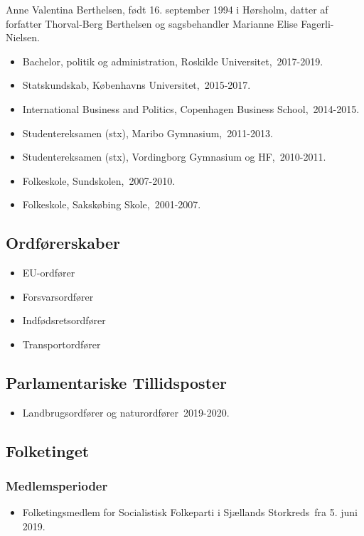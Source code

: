 \documentclass[11pt, a4paper]{awesome-cv}
\begin{document}
\makecvheader[R]
\makelettertitle
\begin{cvletter}
Anne Valentina Berthelsen, født 16. september 1994 i Hørsholm, datter af forfatter Thorval-Berg Berthelsen og sagsbehandler Marianne Elise Fagerli-Nielsen.

\begin{itemize}
\item Bachelor, politik og administration, Roskilde Universitet, 2017-2019.
\item Statskundskab, Københavns Universitet, 2015-2017.
\item International Business and Politics, Copenhagen Business School, 2014-2015.
\item Studentereksamen (stx), Maribo Gymnasium, 2011-2013.
\item Studentereksamen (stx), Vordingborg Gymnasium og HF, 2010-2011.
\item Folkeskole, Sundskolen, 2007-2010.
\item Folkeskole, Sakskøbing Skole, 2001-2007.
\end{itemize}
\subsection*{Ordførerskaber}
\begin{itemize}
\item EU-ordfører
\item Forsvarsordfører
\item Indfødsretsordfører
\item Transportordfører
\end{itemize}
\subsection*{Parlamentariske Tillidsposter}
\begin{itemize}
\item Landbrugsordfører og naturordfører 2019-2020.
\end{itemize}
\subsection*{Folketinget}
\subsubsection*{Medlemsperioder}
\begin{itemize}
\item Folketingsmedlem for Socialistisk Folkeparti i Sjællands Storkreds fra 5. juni 2019.
\end{itemize}

\end{cvletter}
\end{document}
